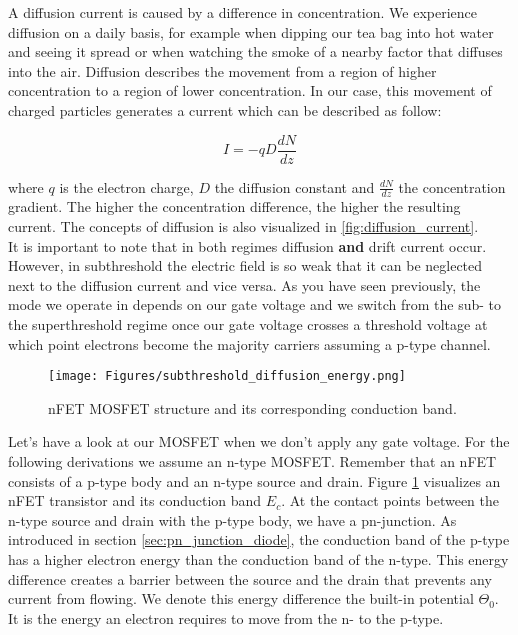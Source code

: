 A diffusion current is caused by a difference in concentration. We experience diffusion on a daily basis, for example when dipping our tea bag into hot water and seeing it spread or when watching the smoke of a nearby factor that diffuses into the air. Diffusion describes the movement from a region of higher concentration to a region of lower concentration. In our case, this movement of charged particles generates a current which can be described as follow:

\begin{equation}
    I = -q D \frac{dN}{dz}
\end{equation}

where $q$ is the electron charge, $D$ the diffusion constant and $\frac{dN}{dz}$ the concentration gradient. The higher the concentration difference, the higher the resulting current. The concepts of diffusion is also visualized in \ref{fig:diffusion_current}.\\

It is important to note that in both regimes diffusion \textbf{and} drift current occur. However, in subthreshold the electric field is so weak that it can be neglected next to the diffusion current and vice versa. As you have seen previously, the mode we operate in depends on our gate voltage and we switch from the sub- to the superthreshold regime once our gate voltage crosses a threshold voltage at which point electrons become the majority carriers assuming a p-type channel.\\

\begin{figure}
    \centering
    \texttt{[image: Figures/subthreshold\_diffusion\_energy.png]}
    \caption{nFET MOSFET structure and its corresponding conduction band.}
    \label{fig:nfet_diffusion_energy}
\end{figure}

Let's have a look at our MOSFET when we don't apply any gate voltage. For the following derivations we assume an n-type MOSFET. Remember that an nFET consists of a p-type body and an n-type source and drain. Figure \ref{fig:nfet_diffusion_energy} visualizes an nFET transistor and its conduction band $E_c$. At the contact points between the n-type source and drain with the p-type body, we have a pn-junction. As introduced in section \ref{sec:pn_junction_diode}, the conduction band of the p-type has a higher electron energy than the conduction band of the n-type. This energy difference creates a barrier between the source and the drain that prevents any current from flowing. We denote this energy difference the built-in potential $\Theta_0$. It is the energy an electron requires to move from the n- to the p-type.\\

